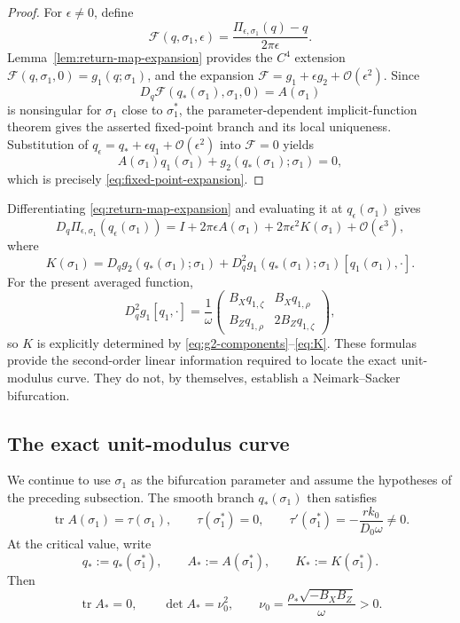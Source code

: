 \documentclass[11pt]{amsart}
\theoremstyle{remark}
\newcommand{\tr}{\operatorname{tr}}
\newcommand{\cO}{\mathcal{O}}
\begin{document}
\begin{proof}
For \(\epsilon\ne0\), define
\[
 \mathcal{F}(q,\sigma_1,\epsilon)
=\frac{\Pi_{\epsilon,\sigma_1}(q)-q}{2\pi\epsilon}.
\]
Lemma~\ref{lem:return-map-expansion} provides the \(C^4\) extension
\(\mathcal{F}(q,\sigma_1,0)=g_1(q;\sigma_1)\), and the expansion
\(\mathcal{F}=g_1+\epsilon g_2+\cO(\epsilon^2)\).  Since
\[
 D_q\mathcal{F}(q_*(\sigma_1),\sigma_1,0)=A(\sigma_1)
\]
is nonsingular for \(\sigma_1\) close to \(\sigma_1^*\), the
parameter-dependent implicit-function theorem gives the asserted fixed-point
branch and its local uniqueness.  Substitution of
\(q_\epsilon=q_*+\epsilon q_1+\cO(\epsilon^2)\) into
\(\mathcal{F}=0\) yields
\[
 A(\sigma_1)q_1(\sigma_1)+g_2(q_*(\sigma_1);\sigma_1)=0,
\]
which is precisely \eqref{eq:fixed-point-expansion}.
\end{proof}

Differentiating \eqref{eq:return-map-expansion} and evaluating it at
\(q_\epsilon(\sigma_1)\) gives
\begin{equation}\label{eq:return-derivative}
D_q\Pi_{\epsilon,\sigma_1}(q_\epsilon(\sigma_1))
=I+2\pi\epsilon A(\sigma_1)+2\pi\epsilon^2K(\sigma_1)
+\cO(\epsilon^3),
\end{equation}
where
\begin{equation}\label{eq:K}
K(\sigma_1)
=D_qg_2(q_*(\sigma_1);\sigma_1)
+D_q^2g_1(q_*(\sigma_1);\sigma_1)[q_1(\sigma_1),\cdot].
\end{equation}
For the present averaged function,
\[
D_q^2g_1[q_1,\cdot]
=\frac1\omega
\begin{pmatrix}
B_Xq_{1,\zeta}&B_Xq_{1,\rho}\\
B_Zq_{1,\rho}&2B_Zq_{1,\zeta}
\end{pmatrix},
\]
so \(K\) is explicitly determined by
\eqref{eq:g2-components}--\eqref{eq:K}.  These formulas provide the
second-order linear information required to locate the exact unit-modulus
curve.  They do not, by themselves, establish a Neimark--Sacker bifurcation.

\subsection{The exact unit-modulus curve}

We continue to use \(\sigma_1\) as the bifurcation parameter and assume
the hypotheses of the preceding subsection.  The smooth branch
\(q_*(\sigma_1)\) then satisfies
\[
 \tr A(\sigma_1)=\tau(\sigma_1),\qquad
 \tau(\sigma_1^*)=0,\qquad
 \tau'(\sigma_1^*)=-\frac{rk_0}{D_0\omega}\ne0.
\]
At the critical value, write
\[
 q_*:=q_*(\sigma_1^*),\qquad
 A_*:=A(\sigma_1^*),\qquad K_*:=K(\sigma_1^*).
\]
Then
\[
 \tr A_*=0,\qquad \det A_*=\nu_0^2,\qquad
 \nu_0=\frac{\rho_*\sqrt{-B_XB_Z}}{\omega}>0.
\]
\end{document}
